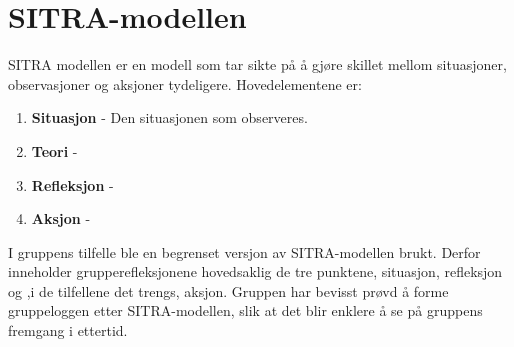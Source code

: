 \section{SITRA-modellen}
SITRA modellen er en modell som tar sikte på å gjøre skillet mellom situasjoner, observasjoner og aksjoner tydeligere.
Hovedelementene er:

\begin{enumerate}
  \item \textbf{Situasjon} - Den situasjonen som observeres.
  \item \textbf{Teori} - 
  \item \textbf{Refleksjon} -
  \item \textbf{Aksjon} - 
\end{enumerate}

I gruppens tilfelle ble en begrenset versjon av SITRA-modellen brukt. 
Derfor inneholder grupperefleksjonene hovedsaklig de tre punktene, situasjon, refleksjon og ,i de tilfellene det trengs, aksjon.
Gruppen har bevisst prøvd å forme gruppeloggen etter SITRA-modellen, slik at det blir enklere å se på gruppens fremgang i ettertid. 
